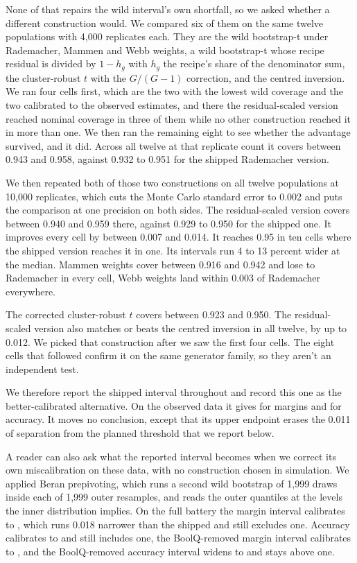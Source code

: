 None of that repairs the wild interval's own shortfall, so we asked whether a different construction would. We compared six of them on the same twelve populations with 4,000 replicates each. They are the wild bootstrap-t under Rademacher, Mammen and Webb weights, a wild bootstrap-t whose recipe residual is divided by $1-h_g$ with $h_g$ the recipe's share of the denominator sum, the cluster-robust $t$ with the $G/(G-1)$ correction, and the centred inversion. We ran four cells first, which are the two with the lowest wild coverage and the two calibrated to the observed estimates, and there the residual-scaled version reached nominal coverage in three of them while no other construction reached it in more than one. We then ran the remaining eight to see whether the advantage survived, and it did. Across all twelve at that replicate count it covers between 0.943 and 0.958, against 0.932 to 0.951 for the shipped Rademacher version.

We then repeated both of those two constructions on all twelve populations at 10,000 replicates, which cuts the Monte Carlo standard error to 0.002 and puts the comparison at one precision on both sides. The residual-scaled version covers between 0.940 and 0.959 there, against 0.929 to 0.950 for the shipped one. It improves every cell by between 0.007 and 0.014. It reaches 0.95 in ten cells where the shipped version reaches it in one. Its intervals run 4 to 13 percent wider at the median. Mammen weights cover between 0.916 and 0.942 and lose to Rademacher in every cell, Webb weights land within 0.003 of Rademacher everywhere.

The corrected cluster-robust $t$ covers between 0.923 and 0.950. The residual-scaled version also matches or beats the centred inversion in all twelve, by up to 0.012. We picked that construction after we saw the first four cells. The eight cells that followed confirm it on the same generator family, so they aren't an independent test.

We therefore report the shipped interval throughout and record this one as the better-calibrated alternative. On the observed data it gives  for margins and  for accuracy. It moves no conclusion, except that its upper endpoint erases the 0.011 of separation from the planned threshold that we report below.

A reader can also ask what the reported interval becomes when we correct its own miscalibration on these data, with no construction chosen in simulation. We applied Beran prepivoting, which runs a second wild bootstrap of 1,999 draws inside each of 1,999 outer resamples, and reads the outer quantiles at the levels the inner distribution implies. On the full battery the margin interval calibrates to , which runs 0.018 narrower than the shipped  and still excludes one. Accuracy calibrates to  and still includes one, the BoolQ-removed margin interval calibrates to , and the BoolQ-removed accuracy interval widens to  and stays above one.

